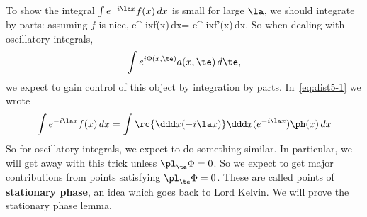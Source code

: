 To show the integral $\int e^{-i\la x}f(x)\,dx$ is small for large $\la$, we should integrate by parts: assuming $f$ is nice, 
\int e^{-i\la x}f(x)\,dx= \int e^{-i\la x}f'(x)\,dx.
\eeq
So when dealing with oscillatory integrals,
\[
\int e^{i\Phi(x,\te)}a(x,\te)\,d\te,
\]
we expect to gain control of this object by integration by parts. In~\eqref{eq:dist5-1} we wrote
\[
\int e^{-i\la x}f(x)\,dx =\int\rc{\ddd x(-i\la x)}\ddd x(e^{-i\la x})\ph(x)\,dx
\]
So for oscillatory integrals, we expect to do something similar. In particular, we will get away with this trick unless $\pl_{\te}\Phi=0$. So we expect to get major contributions from points satisfying $\pl_{\te}\Phi=0$. These are called points of \textbf{stationary phase}, an idea which goes back to Lord Kelvin.
We will prove the stationary phase lemma.

